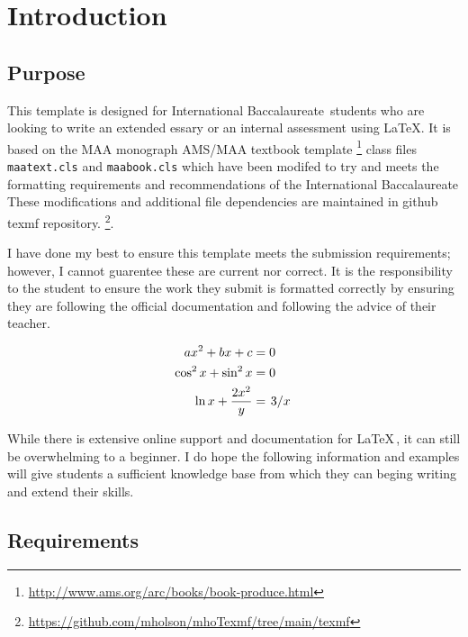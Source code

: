 \chapter{Introduction}

\section{Purpose}

This template is designed for International Baccalaureate\texttrademark\, 
students who are looking to write an extended essary or an internal assessment
using \LaTeX.  It is based on the MAA monograph AMS/MAA textbook template
\footnote{\url{http://www.ams.org/arc/books/book-produce.html}} class files 
\verb!maatext.cls! and \verb!maabook.cls! which have been modifed to try and
meets the formatting requirements and recommendations of the International 
Baccalaureate\texttrademark\, These modifications and additional file 
dependencies are maintained in github texmf repository.
\footnote{\url{https://github.com/mholson/mhoTexmf/tree/main/texmf}}.  

I have done my best to ensure this template meets the submission requirements; 
however, I cannot guarentee these are current nor correct. It is the 
responsibility to the student to ensure the work they submit is formatted 
correctly by ensuring they are following the official documentation and
following the advice of their teacher.\cite{Olson2021}

\begin{align*}
    ax^2 + bx + c &= 0 \\
    \cos^2 x + \sin^2 x &= 0 \\
    \ln x + \dfrac{2x^2}{y} &= \left.{3}\middle/{x}\right.
\end{align*}

While there is extensive online support and documentation for \LaTeX\,, it 
can still be overwhelming to a beginner.  I do hope the following information 
and examples will give students a sufficient knowledge base from which they 
can beging writing and extend their skills. 

\section{Requirements}

